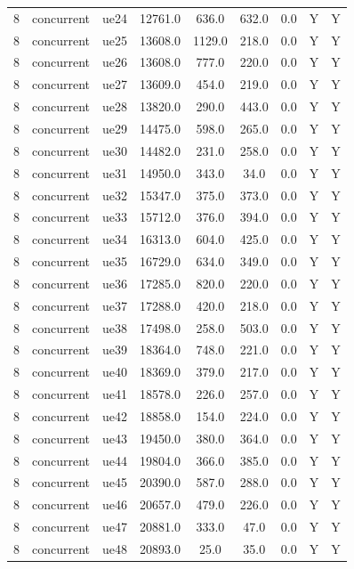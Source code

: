 \begin{table}[ht]
\begin{tabular}{|c|c|c|c|c|c|c|c|c|}
8 & concurrent & ue24 & 12761.0 & 636.0 & 632.0 & 0.0 & Y & Y \\
8 & concurrent & ue25 & 13608.0 & 1129.0 & 218.0 & 0.0 & Y & Y \\
8 & concurrent & ue26 & 13608.0 & 777.0 & 220.0 & 0.0 & Y & Y \\
8 & concurrent & ue27 & 13609.0 & 454.0 & 219.0 & 0.0 & Y & Y \\
8 & concurrent & ue28 & 13820.0 & 290.0 & 443.0 & 0.0 & Y & Y \\
8 & concurrent & ue29 & 14475.0 & 598.0 & 265.0 & 0.0 & Y & Y \\
8 & concurrent & ue30 & 14482.0 & 231.0 & 258.0 & 0.0 & Y & Y \\
8 & concurrent & ue31 & 14950.0 & 343.0 & 34.0 & 0.0 & Y & Y \\
8 & concurrent & ue32 & 15347.0 & 375.0 & 373.0 & 0.0 & Y & Y \\
8 & concurrent & ue33 & 15712.0 & 376.0 & 394.0 & 0.0 & Y & Y \\
8 & concurrent & ue34 & 16313.0 & 604.0 & 425.0 & 0.0 & Y & Y \\
8 & concurrent & ue35 & 16729.0 & 634.0 & 349.0 & 0.0 & Y & Y \\
8 & concurrent & ue36 & 17285.0 & 820.0 & 220.0 & 0.0 & Y & Y \\
8 & concurrent & ue37 & 17288.0 & 420.0 & 218.0 & 0.0 & Y & Y \\
8 & concurrent & ue38 & 17498.0 & 258.0 & 503.0 & 0.0 & Y & Y \\
8 & concurrent & ue39 & 18364.0 & 748.0 & 221.0 & 0.0 & Y & Y \\
8 & concurrent & ue40 & 18369.0 & 379.0 & 217.0 & 0.0 & Y & Y \\
8 & concurrent & ue41 & 18578.0 & 226.0 & 257.0 & 0.0 & Y & Y \\
8 & concurrent & ue42 & 18858.0 & 154.0 & 224.0 & 0.0 & Y & Y \\
8 & concurrent & ue43 & 19450.0 & 380.0 & 364.0 & 0.0 & Y & Y \\
8 & concurrent & ue44 & 19804.0 & 366.0 & 385.0 & 0.0 & Y & Y \\
8 & concurrent & ue45 & 20390.0 & 587.0 & 288.0 & 0.0 & Y & Y \\
8 & concurrent & ue46 & 20657.0 & 479.0 & 226.0 & 0.0 & Y & Y \\
8 & concurrent & ue47 & 20881.0 & 333.0 & 47.0 & 0.0 & Y & Y \\
8 & concurrent & ue48 & 20893.0 & 25.0 & 35.0 & 0.0 & Y & Y \\

\end{tabular}
\end{table}
